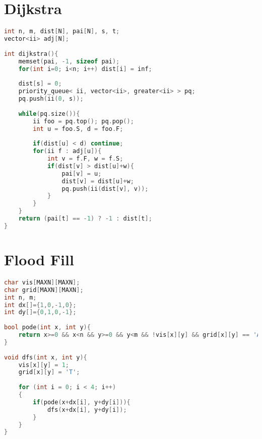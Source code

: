 \documentclass[12pt,a4paper,twoside]{report}
\begin{document}
\section{Dijkstra}
\noindent\begin{lstlisting}[caption=Dijkstra,language=C++]
int n, m, dist[N], pai[N], s, t;
vector<ii> adj[N];
 
int dijkstra(){
    memset(pai, -1, sizeof pai);
    for(int i=0; i<n; i++) dist[i] = inf;
     
    dist[s] = 0;
    priority_queue< ii, vector<ii>, greater<ii> > pq;
    pq.push(ii(0, s));
     
    while(pq.size()){
        ii foo = pq.top(); pq.pop();
        int u = foo.S, d = foo.F;
         
        if(dist[u] < d) continue;
        for(ii f : adj[u]){
            int v = f.F, w = f.S;
            if(dist[v] > dist[u]+w){
                pai[v] = u;
                dist[v] = dist[u]+w;
                pq.push(ii(dist[v], v));
            }
        }
    }
    return (pai[t] == -1) ? -1 : dist[t];
}
\end{lstlisting}

\section{Flood Fill}
\noindent\begin{lstlisting}[caption=Flood Fill,language=C++]
char vis[MAXN][MAXN];
char grid[MAXN][MAXN];
int n, m;
int dx[]={1,0,-1,0};
int dy[]={0,1,0,-1};
 
bool pode(int x, int y){
    return x>=0 && x<n && y>=0 && y<m && !vis[x][y] && grid[x][y] == 'A';
}
 
void dfs(int x, int y){
    vis[x][y] = 1;
    grid[x][y] = 'T';
     
    for (int i = 0; i < 4; i++)
    {
        if(pode(x+dx[i], y+dy[i])){
            dfs(x+dx[i], y+dy[i]);
        }
    }
}
\end{lstlisting}
\end{document}
